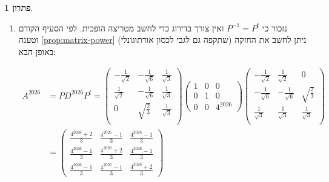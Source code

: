 \documentclass[12pt]{report}
\theoremstyle{plain}
\theoremstyle{definition}
\newtheorem*{solution}{פתרון}
\newcommand{\0}{\mathbf{0}}
\begin{document}
\begin{solution}
\begin{enumerate}[label=\alph*.]
לסיכום: 
$A$
אכן לכסינה אורתוגונלית ומתקיים
$A=PDP^t$
כאשר
$$
.P=\begin{pmatrix} 
-\frac{1}{\sqrt{2}} & -\frac{1}{\sqrt{6}} &  \frac{1}{\sqrt{3}}\\
\frac{1}{\sqrt{2}} & -\frac{1}{\sqrt{6}} & \frac{1}{\sqrt{3}} \\
0 & \sqrt{\frac{2}{3}} & \frac{1}{\sqrt{3}}\\
\end{pmatrix}, \quad D=\begin{pmatrix}
1 & 0 & 0 \\
0 & 1 & 0 \\
0 & 0 & 4
\end{pmatrix}
$$


\item 
נזכור כי
$P^{-1}=P^t$
ואין צורך בדירוג כדי לחשב מטריצה הופכית. לפי הסעיף הקודם וטענה
\ref{prop:matrix-power}
(שתקפה גם לגבי לכסון אורתוגונלי)
ניתן לחשב את החזקה באופן הבא:

$$
\begin{aligned}
A^{2026}&=PD^{2026}P^t=\begin{pmatrix} 
-\frac{1}{\sqrt{2}} & -\frac{1}{\sqrt{6}} &  \frac{1}{\sqrt{3}}\\
\frac{1}{\sqrt{2}} & -\frac{1}{\sqrt{6}} & \frac{1}{\sqrt{3}} \\
0 & \sqrt{\frac{2}{3}} & \frac{1}{\sqrt{3}}\\
\end{pmatrix}\begin{pmatrix}
1 & 0 & 0 \\
0 & 1 & 0 \\
0 & 0 & 4^{2026}
\end{pmatrix}\begin{pmatrix} 
-\frac{1}{\sqrt{2}} & \frac{1}{\sqrt{2}} & 0\\
-\frac{1}{\sqrt{6}} & -\frac{1}{\sqrt{6}} & \sqrt{\frac{2}{3}} \\
\frac{1}{\sqrt{3}} & \frac{1}{\sqrt{3}} & \frac{1}{\sqrt{3}}\\
\end{pmatrix} \\
&=\begin{pmatrix}
\frac{4^{2026}+2}{3} & \frac{4^{2026}-1}{3} & \frac{4^{2026}-1}{3}\\
\frac{4^{2026}-1}{3} & \frac{4^{2026}+2}{3} & \frac{4^{2026}-1}{3}\\
\frac{4^{2026}-1}{3} & \frac{4^{2026}-1}{3} & \frac{4^{2026}+2}{3}
\end{pmatrix}
\end{aligned}
$$


\end{enumerate}
\end{solution}
\end{document}
